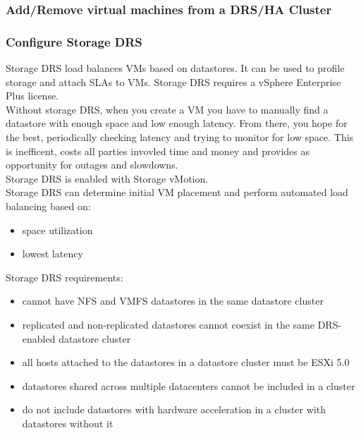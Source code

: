 \subsubsection{Add/Remove virtual machines from a DRS/HA Cluster}

\subsubsection{Configure Storage DRS}

Storage DRS load balances VMs based on datastores. It can be used to profile
storage and attach SLAs to VMs. Storage DRS requires a vSphere Enterprise
Plus license.\\

Without storage DRS, when you create a VM you have to manually find a
datastore with enough space and low enough latency. From there, you hope for
the best, periodically checking latency and trying to monitor for low space.
This is inefficent, costs all parties invovled time and money and provides
as opportunity for outages and slowdowns.\\

Storage DRS is enabled with Storage vMotion.\\

Storage DRS can determine initial VM placement and perform automated load
balancing based on:

\begin{itemize}

\item space utilization
\item lowest latency

\end{itemize}

Storage DRS requirements:

\begin{itemize}

\item cannot have NFS and VMFS datastores in the same datastore cluster

\item replicated and non-replicated datastores cannot coexist in the same
DRS-enabled datastore cluster

\item all hosts attached to the datastores in a datastore cluster must be
ESXi 5.0

\item datastores shared across multiple datacenters cannot be included in
a cluster

\item do not include datastores with hardware acceleration in a cluster
with datastores without it

\end{itemize}

